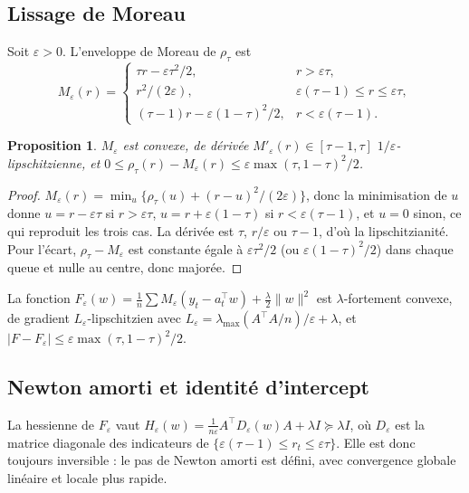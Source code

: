 \documentclass[11pt,a4paper]{article}
\newtheorem{proposition}[theorem]{Proposition}
\theoremstyle{remark}
\theoremstyle{definition}
\newcommand{\pinball}{\rho_\tau}
\newcommand{\T}{^{\top}}
\begin{document}
\subsection{Lissage de Moreau}
Soit $\varepsilon > 0$. L'enveloppe de Moreau de $\pinball$ est
\[
M_\varepsilon(r) = \begin{cases}\tau r - \varepsilon\tau^2/2, & r > \varepsilon\tau,\\[2pt] r^2/(2\varepsilon), & \varepsilon(\tau-1) \le r \le \varepsilon\tau,\\[2pt] (\tau-1) r - \varepsilon(1-\tau)^2/2, & r < \varepsilon(\tau-1).\end{cases}
\]
\begin{proposition}\label{prop:moreau}
$M_\varepsilon$ est convexe, de dérivée $M'_\varepsilon(r) \in [\tau-1,\tau]$ $1/\varepsilon$-lipschitzienne, et
$0 \le \pinball(r) - M_\varepsilon(r) \le \varepsilon\max(\tau,1-\tau)^2/2$.
\end{proposition}
\begin{proof}
$M_\varepsilon(r) = \min_u\{\pinball(u) + (r-u)^2/(2\varepsilon)\}$, donc la minimisation de $u$ donne $u = r - \varepsilon\tau$ si $r > \varepsilon\tau$,
$u = r + \varepsilon(1-\tau)$ si $r < \varepsilon(\tau-1)$, et $u = 0$ sinon, ce qui reproduit les trois cas. La dérivée est $\tau$, $r/\varepsilon$ ou $\tau-1$, d'où la lipschitzianité.
Pour l'écart, $\pinball - M_\varepsilon$ est constante égale à $\varepsilon\tau^2/2$ (ou $\varepsilon(1-\tau)^2/2$) dans chaque queue et nulle au centre, donc majorée.
\end{proof}
La fonction $F_\varepsilon(w) = \frac1n\sum M_\varepsilon(y_t - a_t\T w) + \frac\lambda2\|w\|^2$ est $\lambda$-fortement convexe, de gradient $L_\varepsilon$-lipschitzien avec
$L_\varepsilon = \lambda_{\max}(A\T A/n)/\varepsilon + \lambda$, et $|F - F_\varepsilon| \le \varepsilon\max(\tau,1-\tau)^2/2$.

\subsection{Newton amorti et identité d'intercept}
La hessienne de $F_\varepsilon$ vaut $H_\varepsilon(w) = \frac1{n\varepsilon}A\T D_\varepsilon(w) A + \lambda I \succeq \lambda I$, où $D_\varepsilon$ est la matrice diagonale
des indicateurs de $\{\varepsilon(\tau-1) \le r_t \le \varepsilon\tau\}$. Elle est donc toujours inversible : le pas de Newton amorti est défini,
avec convergence globale linéaire et locale plus rapide.
\end{document}
